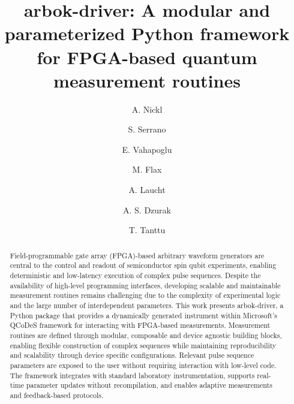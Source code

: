 \documentclass[numbers, preprint, twocolumn,10pt]{elsarticle}
\begin{document}
\renewcommand{\labelenumii}{\arabic{enumi}.\arabic{enumii}}
\onecolumn
\begin{frontmatter}
 


\title{arbok-driver: A modular and parameterized Python framework for FPGA-based quantum measurement routines}

\author[unsw]{A. Nickl}
\author[unsw,diraq]{S. Serrano}
\author[unsw,diraq]{E. Vahapoglu}
\author[unsw,diraq]{M. Flax}
\author[unsw,diraq]{A. Laucht}
\author[unsw,diraq]{A. S. Dzurak}
\author[unsw,diraq]{T. Tanttu}


\address[unsw]{School of Electrical Engineering and Telecommunications, University of New South Wales, Sydney, NSW 2052, Australia}
\address[diraq]{Diraq, Sydney, NSW, Australia}

\begin{abstract}
    \noindent
    Field-programmable gate array (FPGA)-based arbitrary waveform generators are central to the control and readout of semiconductor spin qubit experiments, enabling deterministic and low-latency execution of complex pulse sequences.
    Despite the availability of high-level programming interfaces, developing scalable and maintainable measurement routines remains challenging due to the complexity of experimental logic and the large number of interdependent parameters.
    This work presents arbok-driver, a Python package that provides a dynamically generated instrument within Microsoft's QCoDeS framework for interacting with FPGA-based measurements.
    Measurement routines are defined through modular, composable and device agnostic building blocks, enabling flexible construction of complex sequences while maintaining reproducibility and scalability through device specific configurations. Relevant pulse sequence parameters are exposed to the user without requiring interaction with low-level code.
    The framework integrates with standard laboratory instrumentation, supports real-time parameter updates without recompilation, and enables adaptive measurements and feedback-based protocols.



\end{abstract}
\end{frontmatter}
\end{document}
